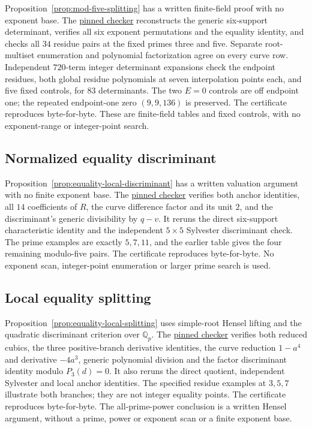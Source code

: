 Proposition~\ref{prop:mod-five-splitting} has a written finite-field proof
with no exponent base. The
\href{https://github.com/the-omega-institute/ideal-intersection-laplacian/blob/7d917afffd7c2616bc052810718dcc720d916a8b/scripts/check_endpoint_one_equality_mod_five.py}{pinned checker}
reconstructs the generic six-support determinant, verifies all six exponent
permutations and the equality identity, and checks all $34$ residue pairs
at the fixed primes three and five. Separate root-multiset enumeration
and polynomial factorization agree on every curve row. Independent
$720$-term integer determinant expansions check the endpoint residues,
both global residue polynomials at seven interpolation points each,
and five fixed controls, for $83$ determinants. The two $E=0$ controls
are off endpoint one; the repeated endpoint-one zero $(9,9,136)$ is
preserved. The certificate reproduces byte-for-byte. These are finite-field
tables and fixed controls, with no exponent-range or integer-point search.

\subsection{Normalized equality discriminant}

Proposition~\ref{prop:equality-local-discriminant} has a written
valuation argument with no finite exponent base. The
\href{https://github.com/the-omega-institute/ideal-intersection-laplacian/blob/4878e51211e2694e40a246759111d55dce070309/scripts/check_endpoint_one_equality_local_discriminant.py}{pinned checker}
verifies both anchor identities, all $14$ coefficients of $R$, the
curve difference factor and its unit $2$, and the discriminant's generic
divisibility by $q-v$. It reruns the direct six-support characteristic
identity and the independent $5\times5$ Sylvester discriminant check.
The prime examples are exactly $5,7,11$, and the earlier table gives
the four remaining modulo-five pairs. The certificate reproduces
byte-for-byte. No exponent scan, integer-point enumeration or larger
prime search is used.

\subsection{Local equality splitting}

Proposition~\ref{prop:equality-local-splitting} uses simple-root Hensel
lifting and the quadratic discriminant criterion over $\mathbb Q_p$.
The
\href{https://github.com/the-omega-institute/ideal-intersection-laplacian/blob/8b87f9df6d402fafc60ed063ab8b12326707febf/scripts/check_endpoint_one_equality_local_splitting.py}{pinned checker}
verifies both reduced cubics, the three positive-branch derivative
identities, the curve reduction $1-a^4$ and derivative $-4a^3$, generic
polynomial division and the factor discriminant
identity modulo $P_3(d)=0$. It also reruns the direct quotient,
independent Sylvester and local anchor identities. The specified
residue examples at $3,5,7$ illustrate both branches; they are not
integer equality points. The certificate reproduces byte-for-byte.
The all-prime-power conclusion is a written Hensel argument, without
a prime, power or exponent scan or a finite exponent base.

